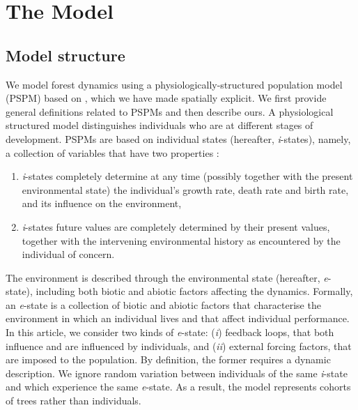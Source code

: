 

\section{The Model}

\subsection{Model structure}

We model forest dynamics using a physiologically-structured population model
(PSPM) based on \citet{Strigul2008}, which we have made spatially explicit. We first
provide general definitions related to PSPMs and then describe ours.
A physiological structured model distinguishes individuals who are at
different stages of development. PSPMs are based on
individual states (hereafter, \textit{i}-states), namely, a collection
of variables that have two properties \citep[for a good overview of PSPMs]{DeRoos1997}:

\begin{enumerate}[label=(\roman*)]
	\item \textit{i}-states completely determine at any time (possibly together with the present environmental state) the individual's growth rate, death rate and birth rate, and its influence on the environment,
	\item \textit{i}-states future values are completely determined by their present values, together with the intervening environmental history as encountered by the individual of concern.
\end{enumerate}

The environment is described through the environmental state (hereafter,
\textit{e}-state), including both biotic and abiotic factors affecting the
dynamics. Formally, an \textit{e}-state is a collection of biotic and abiotic
factors that characterise the environment in which an individual lives and
that affect individual performance. In this article, we consider two kinds of
\textit{e}-state: (\textit{i}) feedback loops, that both influence and are
influenced by individuals, and (\textit{ii}) external forcing factors, that
are imposed to the population. By definition, the former requires
a dynamic description. We ignore random variation between individuals of the
same \textit{i}-state and which experience the same \textit{e}-state. As a
result, the model represents cohorts of trees rather than individuals.

